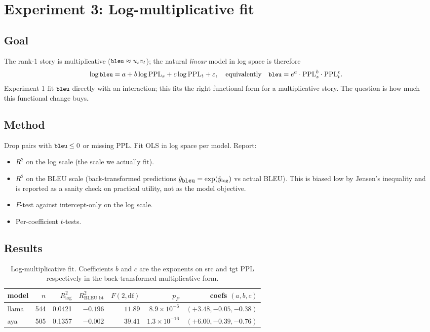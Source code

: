 \documentclass[11pt]{article}
\newcommand{\code}[1]{\texttt{\small #1}}
\newcommand{\ppl}{\mathrm{PPL}}
\begin{document}
\section{Experiment 3: Log-multiplicative fit}

\subsection{Goal}

The rank-1 story is multiplicative ($\code{bleu} \approx u_s v_t$); the
natural \emph{linear} model in log space is therefore
\[
\log \code{bleu} = a + b \log \ppl_s + c \log \ppl_t + \varepsilon,
\quad\text{equivalently}\quad
\code{bleu} = e^a \cdot \ppl_s^{b} \cdot \ppl_t^{c}.
\]
Experiment 1 fit $\code{bleu}$ directly with an interaction; this fits the
right functional form for a multiplicative story. The question is how much
this functional change buys.

\subsection{Method}

Drop pairs with $\code{bleu} \le 0$ or missing PPL. Fit OLS in log space
per model. Report:

\begin{itemize}
  \item $R^2$ on the log scale (the scale we actually fit).
  \item $R^2$ on the BLEU scale (back-transformed predictions
    $\hat{y}_{\code{bleu}} = \exp(\hat{y}_{\log})$ vs actual BLEU). This is
    biased low by Jensen's inequality and is reported as a sanity check
    on practical utility, not as the model objective.
  \item $F$-test against intercept-only on the log scale.
  \item Per-coefficient $t$-tests.
\end{itemize}

\subsection{Results}

\begin{table}[h]
\centering
\small
\begin{tabular}{lrrrrrr}
\toprule
model & $n$ & $R^2_{\log}$ & $R^2_{\text{BLEU bt}}$ & $F(2,\text{df})$ & $p_F$ & coefs $(a,b,c)$ \\
\midrule
llama & 544 & 0.0421 & $-0.196$ & $11.89$ & $8.9\times10^{-6}$ &
  $(+3.48, -0.05, -0.38)$ \\
aya   & 505 & 0.1357 & $-0.002$ & $39.41$ & $1.3\times10^{-16}$ &
  $(+6.00, -0.39, -0.76)$ \\
\bottomrule
\end{tabular}
\caption{Log-multiplicative fit. Coefficients $b$ and $c$ are the exponents
on src and tgt PPL respectively in the back-transformed multiplicative
form.}
\end{table}
\end{document}
